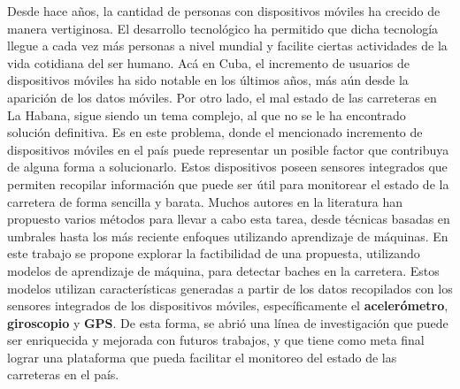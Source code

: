 \begin{resumen}
	Desde hace años, la cantidad de personas con dispositivos móviles ha crecido de manera vertiginosa. El desarrollo
	tecnológico ha permitido que dicha tecnología llegue a cada vez más personas a nivel mundial y facilite ciertas actividades 
	de la vida cotidiana del ser humano. Acá en Cuba, el incremento de usuarios de dispositivos móviles ha sido notable en los últimos
	años, más aún desde la aparición de los datos móviles. Por otro lado, el mal estado de las carreteras en La Habana, sigue siendo un 
	tema complejo, al que no se le ha encontrado solución definitiva. Es en este problema, donde el mencionado incremento de dispositivos
	móviles en el país puede representar un posible factor que contribuya de alguna forma a solucionarlo. Estos dispositivos poseen 
	sensores integrados que permiten recopilar información que puede ser útil para monitorear el estado de la carretera de forma sencilla y 
	barata. Muchos autores en la literatura han propuesto varios métodos para llevar a cabo esta tarea, desde técnicas basadas en umbrales 
	hasta los más reciente enfoques utilizando aprendizaje de máquinas. En este trabajo se propone explorar la factibilidad
	de una propuesta, utilizando modelos de aprendizaje de máquina, para detectar baches en la carretera. Estos modelos utilizan características 
	generadas a partir de los datos recopilados con los sensores integrados de los dispositivos móviles, específicamente el
	\textbf{acelerómetro}, \textbf{giroscopio} y \textbf{GPS}. De esta forma, se abrió una línea de investigación que puede ser enriquecida
	y mejorada con futuros trabajos, y que tiene como meta final lograr una plataforma que pueda facilitar el monitoreo del estado de las
	carreteras en el país.
\end{resumen}

